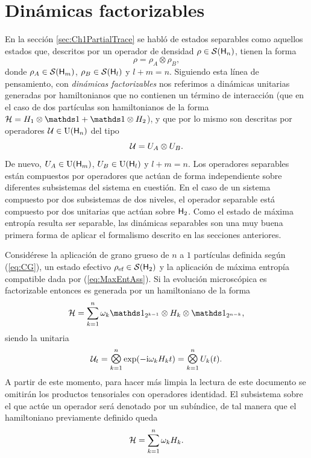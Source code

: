 \section{Dinámicas factorizables}

En la sección \ref{sec:Ch1PartialTrace} se habló de estados separables como aquellos estados que, descritos por un operador de densidad $\rho\in\mathcal{S}({\sf H}_{n})$, tienen la forma
\begin{equation}
    \rho=\rho_{A}\otimes\rho_{B},\nonumber
\end{equation}
donde $\rho_{A}\in\mathcal{S}({\sf H}_{m})$, $\rho_{B}\in\mathcal{S}({\sf H}_{l})$ y $l+m=n$. Siguiendo esta línea de pensamiento, con \textit{dinámicas factorizables} nos referimos a dinámicas unitarias generadas por hamiltonianos que no contienen un término de interacción (que en el caso de dos partículas son hamiltonianos de la forma $\mcH=H_{1}\otimes\Id+\Id\otimes H_{2}$), y que por lo mismo son descritas por operadores $\mathcal{U}\in\text{U}({\sf H}_{n})$ del tipo
\begin{equation}
    \mathcal{U}=U_{A}\otimes U_{B}.\nonumber
\end{equation}
De nuevo, $U_{A}\in\text{U}({\sf H}_{m})$, $U_{B}\in\text{U}({\sf H}_{l})$ y $l+m=n$. Los operadores separables están compuestos por operadores que actúan de forma independiente sobre diferentes subsistemas del sistema en cuestión. En el caso de un sistema compuesto por dos subsistemas de dos niveles, el operador separable está compuesto por dos unitarias que actúan sobre ${\sf H}_{2}$. Como el estado de máxima entropía resulta ser separable, las dinámicas separables son una muy buena primera forma de aplicar el formalismo descrito en las secciones anteriores.

Considérese la aplicación de grano grueso de $n$ a $1$ partículas definida según (\ref{eq:CG}), un estado efectivo $\rho_{\text{ef}}\in\mathcal{S}({\sf H}_{2})$ y la aplicación de máxima entropía compatible dada por (\ref{eq:MaxEntAss}). Si la evolución microscópica es factorizable entonces es generada por un hamiltoniano de la forma
\begin{equation*}
    \mcH=\sum_{k=1}^{n}\omega_{k}\Id_{2^{k-1}}\otimes H_{k} \otimes \Id_{2^{n-k}},
\end{equation*}
siendo la unitaria 
\begin{equation}\label{eq:NFactorUnitaries}
    \mcU_{t}=\Motimes_{k=1}^{n}\text{exp}\qty(-\rmi\omega_{k}H_{k}t)=\Motimes_{k=1}^{n} U_{k}(t).
\end{equation}
A partir de este momento, para hacer más limpia la lectura de este documento se omitirán los productos tensoriales con operadores identidad. El subsistema sobre el que actúe un operador será denotado por un subíndice, de tal manera que el hamiltoniano previamente definido queda
\begin{equation*}
    \mathcal{H}=\sum_{k=1}^{n}\omega_{k}H_{k}.
\end{equation*}



